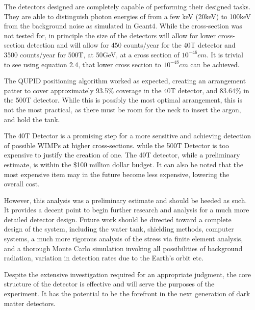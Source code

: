 \documentclass[11pt,a4paper,oneside]{report}
\begin{document}
The detectors designed are completely capable of performing their designed tasks. They are able to distinguish photon energies of from a few keV (20keV) to 100keV from the background noise as simulated in Geant4. While the cross-section was not tested for, in principle the size of the detectors will allow for lower cross-section detection and will allow for 450 counts/year for the 40T detector and 3500 counts/year for 500T, at 50GeV, at a cross section of $10^{-46}cm$. It is trivial to see using equation 2.4, that lower cross section to $10^{-48}cm$ can be achieved.

The QUPID positioning algorithm worked as expected, creating an arrangement patter to cover approximately 93.5$\%$ coverage in the 40T detector, and 83.64$\%$ in the 500T detector. While this is possibly the most optimal arrangement, this is not the most practical, as there must be room for the neck to insert the argon, and hold the tank.

The 40T Detector is a promising step for a more sensitive and achieving detection of possible WIMPs at higher cross-sections. while the 500T Detector is too expensive to justify the creation of one. The 40T detector, while a preliminary estimate, is within the $\$$100 million dollar budget. It can also be noted that the most expensive item may in the future become less expensive, lowering the overall cost. 

However, this analysis was a preliminary estimate and should be heeded as such. It provides a decent point to begin further research and analysis for a much more detailed detector design. Future work should be directed toward a complete design of the system, including the water tank, shielding methods, computer systems, a much more rigorous analysis of the stress via finite element analysis, and a thorough Monte Carlo simulation invoking all possibilities of background radiation, variation in detection rates due to the Earth's orbit etc.

Despite the extensive investigation required for an appropriate judgment, the core structure of the detector is effective and will serve the purposes of the experiment. It has the potential to be the forefront in the next generation of dark matter detectors. 



\newpage
\appendix
\end{document}
